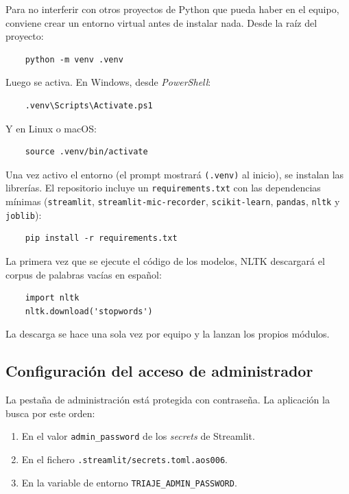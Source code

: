 Para no interferir con otros proyectos de Python que pueda haber en el equipo, conviene crear un entorno virtual antes de instalar nada. Desde la raíz del proyecto:

\begin{verbatim}
	python -m venv .venv
\end{verbatim}

Luego se activa. En Windows, desde \textit{PowerShell}:

\begin{verbatim}
	.venv\Scripts\Activate.ps1
\end{verbatim}

Y en Linux o macOS:

\begin{verbatim}
	source .venv/bin/activate
\end{verbatim}

Una vez activo el entorno (el prompt mostrará \texttt{(.venv)} al inicio), se instalan las librerías. El repositorio incluye un \texttt{requirements.txt} con las dependencias mínimas (\texttt{streamlit}, \texttt{streamlit-mic-recorder}, \texttt{scikit-learn}, \texttt{pandas}, \texttt{nltk} y \texttt{joblib}):

\begin{verbatim}
	pip install -r requirements.txt
\end{verbatim}

La primera vez que se ejecute el código de los modelos, NLTK descargará el corpus de palabras vacías en español:

\begin{verbatim}
	import nltk
	nltk.download('stopwords')
\end{verbatim}

La descarga se hace una sola vez por equipo y la lanzan los propios módulos.

\subsection{Configuración del acceso de administrador}

La pestaña de administración está protegida con contraseña. La aplicación la busca por este orden:

\begin{enumerate}
	\item En el valor \texttt{admin\_password} de los \textit{secrets} de Streamlit.
	\item En el fichero \texttt{.streamlit/secrets.toml.aos006}.
	\item En la variable de entorno \texttt{TRIAJE\_ADMIN\_PASSWORD}.
\end{enumerate}

